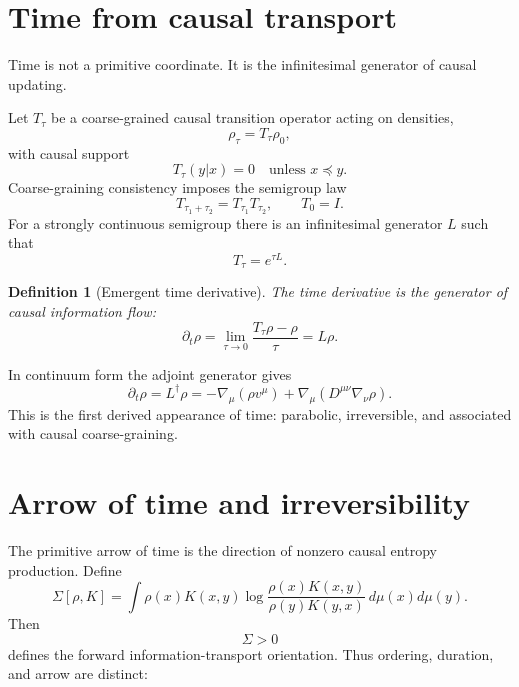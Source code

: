\documentclass[11pt]{article}
\newtheorem{definition}{Definition}[section]
\newcommand{\pre}{\preceq}
\begin{document}
\section{Time from causal transport}

Time is not a primitive coordinate. It is the infinitesimal generator of causal updating.

Let $T_\tau$ be a coarse-grained causal transition operator acting on densities,
\begin{equation}
\rho_\tau=T_\tau\rho_0,
\end{equation}
with causal support
\begin{equation}
T_\tau(y|x)=0\quad\text{unless }x\pre y.
\end{equation}
Coarse-graining consistency imposes the semigroup law
\begin{equation}
T_{\tau_1+\tau_2}=T_{\tau_1}T_{\tau_2},\qquad T_0=I.
\end{equation}
For a strongly continuous semigroup there is an infinitesimal generator $L$ such that
\begin{equation}
T_\tau=e^{\tau L}.
\end{equation}

\begin{definition}[Emergent time derivative]
The time derivative is the generator of causal information flow:
\begin{equation}
\boxed{\partial_t\rho=\lim_{\tau\to0}\frac{T_\tau\rho-\rho}{\tau}=L\rho.}
\end{equation}
\end{definition}

In continuum form the adjoint generator gives
\begin{equation}
\partial_t\rho=L^\dagger\rho
=-\nabla_\mu(\rho v^\mu)+\nabla_\mu(D^{\mu\nu}\nabla_\nu\rho).
\end{equation}
This is the first derived appearance of time: parabolic, irreversible, and associated with causal coarse-graining.

\section{Arrow of time and irreversibility}

The primitive arrow of time is the direction of nonzero causal entropy production. Define
\begin{equation}
\Sigma[\rho,K]=\int \rho(x)K(x,y)
\log\frac{\rho(x)K(x,y)}{\rho(y)K(y,x)}\,d\mu(x)d\mu(y).
\end{equation}
Then
\begin{equation}
\Sigma>0
\end{equation}
defines the forward information-transport orientation. Thus ordering, duration, and arrow are distinct:
\end{document}
